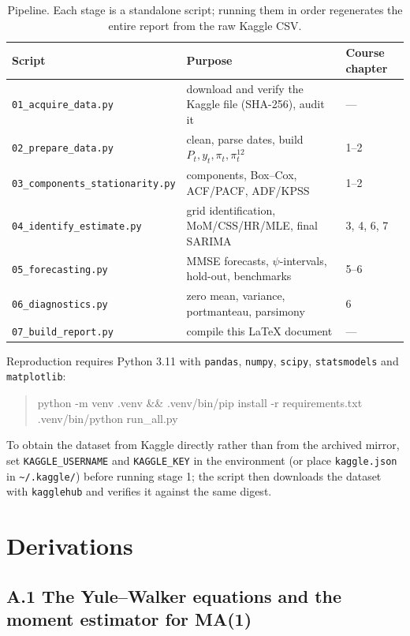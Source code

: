 \begin{table}[htbp]
\centering
\small
\caption{Pipeline. Each stage is a standalone script; running them in order
regenerates the entire report from the raw Kaggle CSV.}
\label{tab:pipeline}
\begin{tabular}{@{}lll@{}}
\toprule
Script & Purpose & Course chapter \\
\midrule
\texttt{01\_acquire\_data.py} & download and verify the Kaggle file (SHA-256), audit it & --- \\
\texttt{02\_prepare\_data.py} & clean, parse dates, build $P_t,y_t,\pi_t,\pi^{12}_t$ & 1--2 \\
\texttt{03\_components\_stationarity.py} & components, Box--Cox, ACF/PACF, ADF/KPSS & 1--2 \\
\texttt{04\_identify\_estimate.py} & grid identification, MoM/CSS/HR/MLE, final SARIMA & 3, 4, 6, 7 \\
\texttt{05\_forecasting.py} & MMSE forecasts, $\psi$-intervals, hold-out, benchmarks & 5--6 \\
\texttt{06\_diagnostics.py} & zero mean, variance, portmanteau, parsimony & 6 \\
\texttt{07\_build\_report.py} & compile this \LaTeX{} document & --- \\
\bottomrule
\end{tabular}
\end{table}

Reproduction requires Python 3.11 with \texttt{pandas}, \texttt{numpy},
\texttt{scipy}, \texttt{statsmodels} and \texttt{matplotlib}:

\begin{quote}\ttfamily\small
python -m venv .venv \&\& .venv/bin/pip install -r requirements.txt\\
.venv/bin/python run\_all.py
\end{quote}

To obtain the dataset from Kaggle directly rather than from the archived mirror,
set \texttt{KAGGLE\_USERNAME} and \texttt{KAGGLE\_KEY} in the environment (or place
\texttt{kaggle.json} in \texttt{\textasciitilde/.kaggle/}) before running stage 1;
the script then downloads the dataset with \texttt{kagglehub} and verifies it
against the same digest.

\section{Derivations}
\label{app:derivations}

\subsection*{A.1 The Yule--Walker equations and the moment estimator for MA(1)}

